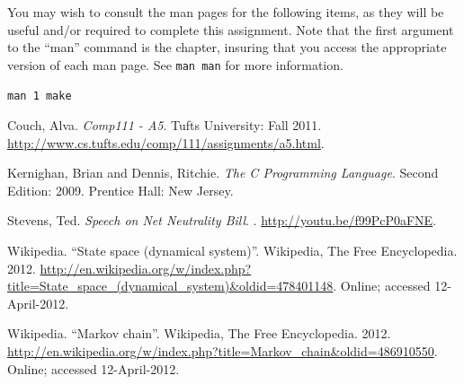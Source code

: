 \documentclass[12pt]{article}
\newenvironment{packed_item}{
\begin{itemize}
  \setlength{\itemsep}{1pt}
  \setlength{\parskip}{0pt}
  \setlength{\parsep}{0pt}
}{\end{itemize}}
\begin{document}
You may wish to consult the man pages for the following items, as they
will be useful and/or required to complete this assignment. Note that
the first argument to the ``man'' command is the chapter, insuring
that you access the appropriate version of each man page. See
\texttt{man man} for more information.

\begin{packed_item}
\item \texttt{man 1 make}
\end{packed_item}

\begin{thebibliography}{3}

 Couch, Alva.
  \newblock \emph{Comp111 - A5}.
  \newblock Tufts University: Fall 2011.
  \newblock \url{http://www.cs.tufts.edu/comp/111/assignments/a5.html}.

 Kernighan, Brian and Dennis, Ritchie.
  \newblock \emph{The C Programming Language}.
  \newblock Second Edition: 2009.
  \newblock Prentice Hall: New Jersey.

 Stevens, Ted.
  \newblock \emph{Speech on Net Neutrality Bill}.
  .
  \newblock \url{http://youtu.be/f99PcP0aFNE}.

 Wikipedia.
  \newblock ``State space (dynamical system)''.
  \newblock Wikipedia, The Free Encyclopedia. 2012.
  \newblock
  \url{http://en.wikipedia.org/w/index.php?title=State_space_(dynamical_system)&oldid=478401148}.
  \newblock Online; accessed 12-April-2012.

 Wikipedia.
  \newblock ``Markov chain''.
  \newblock Wikipedia, The Free Encyclopedia. 2012.
  \newblock
  \url{http://en.wikipedia.org/w/index.php?title=Markov_chain&oldid=486910550}.
  \newblock Online; accessed 12-April-2012.

\end{thebibliography}
\end{document}
